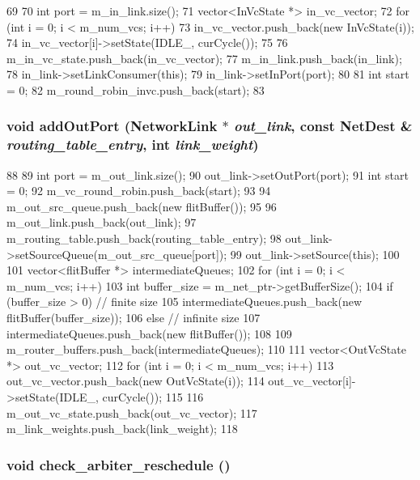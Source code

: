 \begin{DoxyCode}
69 {
70     int port = m_in_link.size();
71     vector<InVcState *> in_vc_vector;
72     for (int i = 0; i < m_num_vcs; i++) {
73         in_vc_vector.push_back(new InVcState(i));
74         in_vc_vector[i]->setState(IDLE_, curCycle());
75     }
76     m_in_vc_state.push_back(in_vc_vector);
77     m_in_link.push_back(in_link);
78     in_link->setLinkConsumer(this);
79     in_link->setInPort(port);
80 
81     int start = 0;
82     m_round_robin_invc.push_back(start);
83 }
\end{DoxyCode}
\hypertarget{classRouter_a8958cd696038e2c830e9ab3445bb1ae5}{
\subsubsection[{addOutPort}]{\setlength{\rightskip}{0pt plus 5cm}void addOutPort ({\bf NetworkLink} $\ast$ {\em out\_\-link}, \/  const {\bf NetDest} \& {\em routing\_\-table\_\-entry}, \/  int {\em link\_\-weight})}}
\label{classRouter_a8958cd696038e2c830e9ab3445bb1ae5}



\begin{DoxyCode}
88 {
89     int port = m_out_link.size();
90     out_link->setOutPort(port);
91     int start = 0;
92     m_vc_round_robin.push_back(start);
93 
94     m_out_src_queue.push_back(new flitBuffer());
95 
96     m_out_link.push_back(out_link);
97     m_routing_table.push_back(routing_table_entry);
98     out_link->setSourceQueue(m_out_src_queue[port]);
99     out_link->setSource(this);
100 
101     vector<flitBuffer *> intermediateQueues;
102     for (int i = 0; i < m_num_vcs; i++) {
103         int buffer_size = m_net_ptr->getBufferSize();
104         if (buffer_size > 0) // finite size
105             intermediateQueues.push_back(new flitBuffer(buffer_size));
106         else // infinite size
107             intermediateQueues.push_back(new flitBuffer());
108     }
109     m_router_buffers.push_back(intermediateQueues);
110 
111     vector<OutVcState *> out_vc_vector;
112     for (int i = 0; i < m_num_vcs; i++) {
113         out_vc_vector.push_back(new OutVcState(i));
114         out_vc_vector[i]->setState(IDLE_, curCycle());
115     }
116     m_out_vc_state.push_back(out_vc_vector);
117     m_link_weights.push_back(link_weight);
118 }
\end{DoxyCode}
\hypertarget{classRouter_a16c0664c8f37fe80b30fd3e7cd90fa33}{
\subsubsection[{check\_\-arbiter\_\-reschedule}]{\setlength{\rightskip}{0pt plus 5cm}void check\_\-arbiter\_\-reschedule ()}}
\label{classRouter_a16c0664c8f37fe80b30fd3e7cd90fa33}



